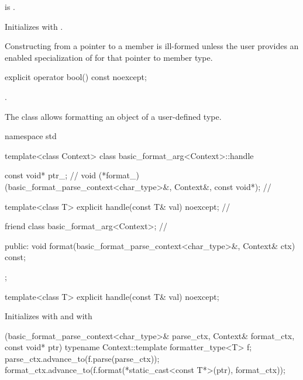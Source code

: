 \begin{itemdescr}
\pnum
\constraints
{} is .

\pnum
\effects
Initializes  with .

\pnum
\begin{note}
Constructing  from
a pointer to a member is ill-formed unless
the user provides an enabled specialization of
 for that pointer to member type.
\end{note}
\end{itemdescr}
%

%
\begin{itemdecl}
explicit operator bool() const noexcept;
\end{itemdecl}

\begin{itemdescr}
\pnum
\returns
{}.
\end{itemdescr}

\pnum
The class  allows formatting an object of a user-defined type.

%
%
\begin{codeblock}
namespace std {
  template<class Context>
  class basic_format_arg<Context>::handle {
    const void* ptr_;                                           // \expos
    void (*format_)(basic_format_parse_context<char_type>&,
                    Context&, const void*);                     // \expos

    template<class T> explicit handle(const T& val) noexcept;   // \expos

    friend class basic_format_arg<Context>;                     // \expos

  public:
    void format(basic_format_parse_context<char_type>&, Context& ctx) const;
  };
}
\end{codeblock}

%
\begin{itemdecl}
template<class T> explicit handle(const T& val) noexcept;
\end{itemdecl}

\begin{itemdescr}
\pnum
\effects
Initializes
 with  and
 with
\begin{codeblock}
[](basic_format_parse_context<char_type>& parse_ctx,
   Context& format_ctx, const void* ptr) {
  typename Context::template formatter_type<T> f;
  parse_ctx.advance_to(f.parse(parse_ctx));
  format_ctx.advance_to(f.format(*static_cast<const T*>(ptr), format_ctx));
}
\end{codeblock}
\end{itemdescr}


